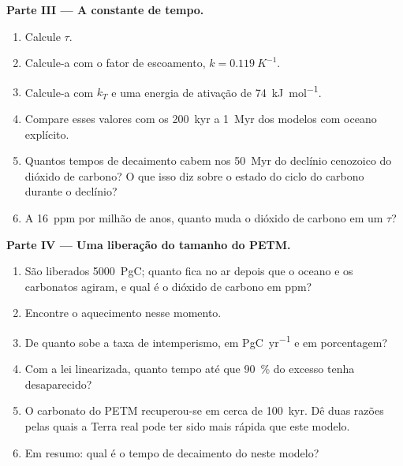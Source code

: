 \begin{problem}
\noindent\textbf{Parte III --- A constante de tempo.}
\begin{enumerate}[resume]
  \item Calcule $\tau$.
  \item Calcule-a com o fator de escoamento, $k = \qty{0.119}{K^{-1}}$.
  \item Calcule-a com $k_T$ e uma energia de ativação de \qty{74}{kJ.mol^{-1}}.
  \item Compare esses valores com os \qty{200}{kyr} a \qty{1}{Myr} dos modelos com oceano explícito.
  \item Quantos tempos de decaimento cabem nos \qty{50}{Myr} do declínio cenozoico do dióxido de
        carbono? O que isso diz sobre o estado do ciclo do carbono durante o declínio?
  \item A \qty{16}{ppm} por milhão de anos, quanto muda o dióxido de carbono em um $\tau$?
\end{enumerate}

\noindent\textbf{Parte IV --- Uma liberação do tamanho do PETM.}
\begin{enumerate}[resume]
  \item São liberados \qty{5000}{PgC}; quanto fica no ar depois que o oceano e os carbonatos
        agiram, e qual é o dióxido de carbono em ppm?
  \item Encontre o aquecimento nesse momento.
  \item De quanto sobe a taxa de intemperismo, em \unit{PgC.yr^{-1}} e em porcentagem?
  \item Com a lei linearizada, quanto tempo até que \qty{90}{\percent} do excesso tenha desaparecido?
  \item O carbonato do PETM recuperou-se em cerca de \qty{100}{kyr}. Dê duas razões pelas quais a Terra
        real pode ter sido mais rápida que este modelo.
  \item Em resumo: qual é o tempo de decaimento do  neste modelo?
\end{enumerate}
\end{problem}
